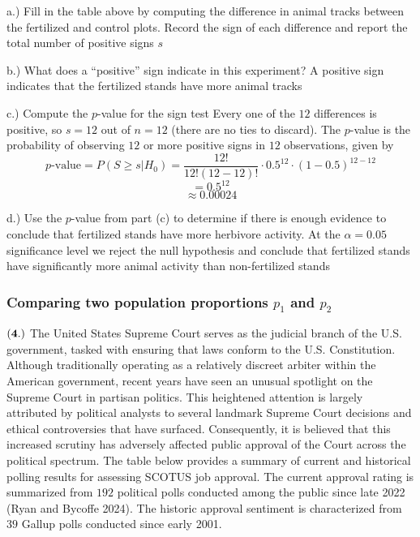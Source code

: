 \documentclass[
]{article}
\begin{document}
a.) Fill in the table above by computing the difference in animal tracks
between the fertilized and control plots. Record the sign of each
difference and report the total number of positive signs \(s\)

b.) What does a ``positive'' sign indicate in this experiment? {A
positive sign indicates that the fertilized stands have more animal
tracks}

c.) Compute the \(p\)-value for the sign test {Every one of the \(12\)
differences is positive, so \(s = 12\) out of \(n = 12\) (there are no
ties to discard). The \(p\)-value is the probability of observing \(12\)
or more positive signs in \(12\) observations, given by
\[p\text{-value} = P(S\geq s | H_0) = \frac{12!}{12!(12 - 12)!} \cdot 0.5^{12}\cdot(1-0.5)^{12-12} \]
\[ = 0.5^{12} \] \[ \approx 0.00024  \]}

d.) Use the \(p\)-value from part (c) to determine if there is enough
evidence to conclude that fertilized stands have more herbivore
activity. {At the \(\alpha = 0.05\) significance level we reject the
null hypothesis and conclude that fertilized stands have significantly
more animal activity than non-fertilized stands}

\subsubsection{\texorpdfstring{Comparing two population proportions
\(p_1\) and
\(p_2\)}{Comparing two population proportions p\_1 and p\_2}}\label{comparing-two-population-proportions-p_1-and-p_2}

\(\bf (4.)\) The United States Supreme Court serves as the judicial
branch of the U.S. government, tasked with ensuring that laws conform to
the U.S. Constitution. Although traditionally operating as a relatively
discreet arbiter within the American government, recent years have seen
an unusual spotlight on the Supreme Court in partisan politics. This
heightened attention is largely attributed by political analysts to
several landmark Supreme Court decisions and ethical controversies that
have surfaced. Consequently, it is believed that this increased scrutiny
has adversely affected public approval of the Court across the political
spectrum. The table below provides a summary of current and historical
polling results for assessing SCOTUS job approval. The current approval
rating is summarized from \(192\) political polls conducted among the
public since late 2022 (Ryan and Bycoffe 2024). The historic approval
sentiment is characterized from \(39\) Gallup polls conducted since
early 2001.
\end{document}
